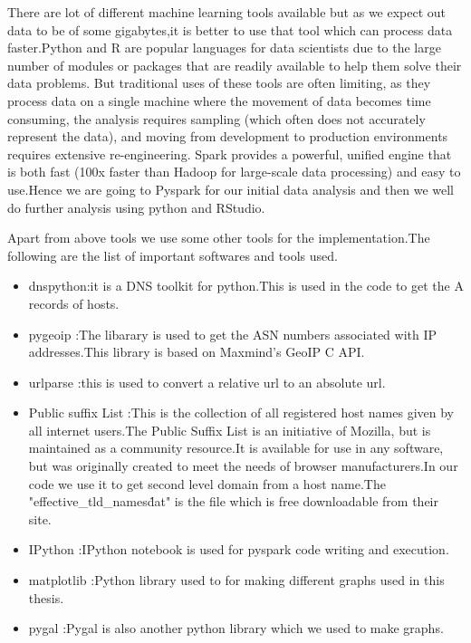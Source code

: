 There are lot of different machine learning tools available but as we expect out data to be of some gigabytes,it is better to use that tool which can process data faster.Python and R are popular languages for data scientists due to the large number of modules or packages that are readily available to help them solve their data problems. But traditional uses of these tools are often limiting, as they process data on a single machine where the movement of data becomes time consuming, the analysis requires sampling (which often does not accurately represent the data), and moving from development to production environments requires extensive re-engineering. Spark provides a powerful, unified engine that is both fast (100x faster than Hadoop for large-scale data processing) and easy to use.Hence we are going to Pyspark for our initial data analysis and then we well do further analysis using python and RStudio.

Apart from above tools we use some other tools for the implementation.The following are the list of important softwares and tools used.

\begin{itemize}
  \item dnspython:it is a DNS toolkit for python.This is used in the code to get the A records of hosts.
  \item pygeoip :The libarary is used to get the ASN numbers associated with IP addresses.This library is based on Maxmind’s GeoIP C API.
  \item urlparse :this is used to convert a relative url to an absolute url.
  \item Public suffix List :This is the collection of all registered host names given by all internet users.The Public Suffix List is an initiative of Mozilla, but is maintained as a community resource.It is available for use in any software, but was originally created to meet the needs of browser manufacturers.In our code we use it to get second level domain from a host name.The "effective\_tld\_names\. dat" is the file which is free downloadable from their site.
  \item IPython :IPython notebook is used for pyspark code writing and execution.
  \item matplotlib :Python library used to for making different graphs used in this thesis.
  \item pygal :Pygal is also another python library which we used to make graphs.
\end{itemize}


